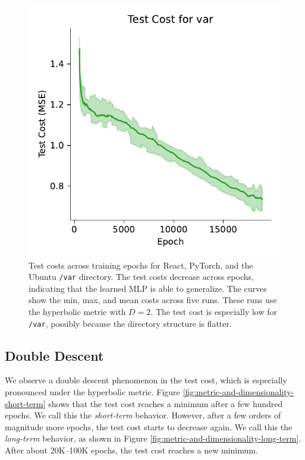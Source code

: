 \documentclass{article}
\begin{document}
\begin{figure}[H]
\begin{minipage}{0.33\textwidth}
  \end{minipage}%
  \begin{minipage}{0.33\textwidth}
    \centering
    \includegraphics[width=\linewidth]{figures/basic_test_cost_var.pdf}
  \end{minipage}
  \caption{Test costs across training epochs for React, PyTorch, and the Ubuntu \texttt{/var} directory. The test costs decrease across epochs, indicating that the learned MLP is able to generalize. The curves show the min, max, and mean costs across five runs. These runs use the hyperbolic metric with $D=2$. The test cost is especially low for \texttt{/var}, possibly because the directory structure is flatter.}
  \label{fig:basic-test-costs}
\end{figure}

\subsection{Double Descent}

We observe a double descent phenomenon in the test cost, which is especially pronounced under the hyperbolic metric. Figure \ref{fig:metric-and-dimensionality-short-term} shows that the test cost reaches a minimum after a few hundred epochs. We call this the \emph{short-term} behavior. However, after a few orders of magnitude more epochs, the test cost starts to decrease again. We call this the \emph{long-term} behavior, as shown in Figure \ref{fig:metric-and-dimensionality-long-term}. After about 20K--100K epochs, the test cost reaches a new minimum.
\end{document}
